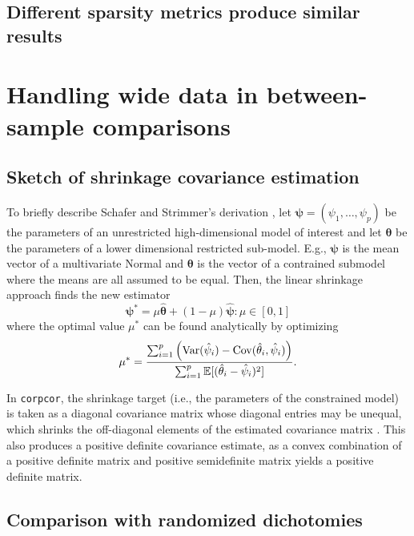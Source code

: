 \documentclass[draft]{cmustatproposal} %
\begin{document}
\subsection{Different sparsity metrics produce similar results}
\label{appx:sparsity_vs}

\newpage

\section{Handling wide data in between-sample comparisons}

\subsection{Sketch of shrinkage covariance estimation}
\label{appx:shrinkage}

To briefly describe Schafer and Strimmer's derivation \cite{schafer_shrinkage_2005}, let \( \boldsymbol{\psi} = (\psi_1, \dots, \psi_p) \) be the parameters of an unrestricted high-dimensional model of interest and let \( \boldsymbol{\theta} \) be the parameters of a lower dimensional restricted sub-model. E.g., \( \boldsymbol{\psi} \) is the mean vector of a multivariate Normal and \( \boldsymbol{\theta} \) is the vector of a contrained submodel where the means are all assumed to be equal. Then, the linear shrinkage approach finds the new estimator
\[ \boldsymbol{\psi}^* = \mu \hat{\boldsymbol{\theta}} + (1 - \mu) \hat{\boldsymbol{\psi}} : \mu \in [0, 1] \]
where the optimal value \( \mu^* \) can be found analytically by optimizing 
\[ \mu^* = 
\frac
{\sum_{i = 1}^p \left( \operatorname*{Var} (\hat\psi_i) - \operatorname*{Cov} (\hat\theta_i, \hat\psi_i) \right)}
{\sum_{i = 1}^p \mathbb{E} [(\hat\theta_i - \hat\psi_i)^2]}. \]

In \texttt{corpcor}, the shrinkage target (i.e., the parameters of the constrained model) is taken as a diagonal covariance matrix whose diagonal entries may be unequal, which shrinks the off-diagonal elements of the estimated covariance matrix \cite{schafer_shrinkage_2005, schafer_corpcor_2021}. This also produces a positive definite covariance estimate, as a convex combination of a positive definite matrix and positive semidefinite matrix yields a positive definite matrix. 

\subsection{Comparison with randomized dichotomies}
\end{document}

